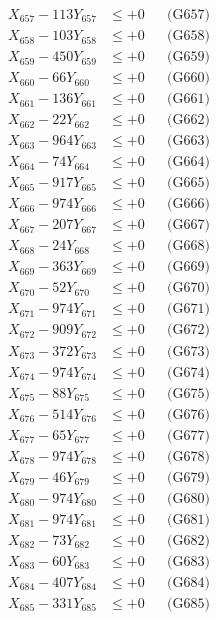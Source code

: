 \documentclass[a4paper,10pt]{article}
\begin{document}
{\begin{align}
X_{657} - 113Y_{657} &\leq +0 && \text{(G657)} \\
X_{658} - 103Y_{658} &\leq +0 && \text{(G658)} \\
X_{659} - 450Y_{659} &\leq +0 && \text{(G659)} \\
X_{660} - 66Y_{660} &\leq +0 && \text{(G660)} \\
\allowbreak
X_{661} - 136Y_{661} &\leq +0 && \text{(G661)} \\
X_{662} - 22Y_{662} &\leq +0 && \text{(G662)} \\
X_{663} - 964Y_{663} &\leq +0 && \text{(G663)} \\
X_{664} - 74Y_{664} &\leq +0 && \text{(G664)} \\
X_{665} - 917Y_{665} &\leq +0 && \text{(G665)} \\
X_{666} - 974Y_{666} &\leq +0 && \text{(G666)} \\
X_{667} - 207Y_{667} &\leq +0 && \text{(G667)} \\
X_{668} - 24Y_{668} &\leq +0 && \text{(G668)} \\
X_{669} - 363Y_{669} &\leq +0 && \text{(G669)} \\
X_{670} - 52Y_{670} &\leq +0 && \text{(G670)} \\
\allowbreak
X_{671} - 974Y_{671} &\leq +0 && \text{(G671)} \\
X_{672} - 909Y_{672} &\leq +0 && \text{(G672)} \\
X_{673} - 372Y_{673} &\leq +0 && \text{(G673)} \\
X_{674} - 974Y_{674} &\leq +0 && \text{(G674)} \\
X_{675} - 88Y_{675} &\leq +0 && \text{(G675)} \\
X_{676} - 514Y_{676} &\leq +0 && \text{(G676)} \\
X_{677} - 65Y_{677} &\leq +0 && \text{(G677)} \\
X_{678} - 974Y_{678} &\leq +0 && \text{(G678)} \\
X_{679} - 46Y_{679} &\leq +0 && \text{(G679)} \\
X_{680} - 974Y_{680} &\leq +0 && \text{(G680)} \\
\allowbreak
X_{681} - 974Y_{681} &\leq +0 && \text{(G681)} \\
X_{682} - 73Y_{682} &\leq +0 && \text{(G682)} \\
X_{683} - 60Y_{683} &\leq +0 && \text{(G683)} \\
X_{684} - 407Y_{684} &\leq +0 && \text{(G684)} \\
X_{685} - 331Y_{685} &\leq +0 && \text{(G685)} \\

\end{align}}
\end{document}
